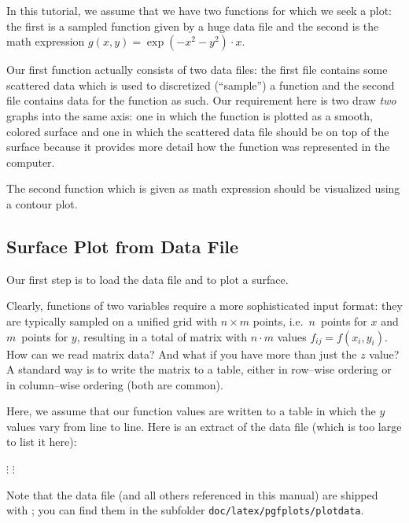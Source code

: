 
In this tutorial, we assume that we have two functions for which we seek a plot: the first is a sampled function given by a huge data file and the second is the math expression $g(x,y)=\exp(-x^2-y^2)\cdot x$. 

Our first function actually consists of two data files: the first file contains some scattered data which is used to discretized (``sample'') a function and the second file contains data for the function as such. 
Our requirement here is two draw \emph{two} graphs into the same axis: one in which the function is plotted as a smooth, colored surface and one in which the scattered data file should be on top of the surface because it provides more detail how the function was represented in the computer. 

The second function which is given as math expression should be visualized using a contour plot. 


\subsection{Surface Plot from Data File}
Our first step is to load the data file and to plot a surface. 

Clearly, functions of two variables require a more sophisticated input format: they are typically sampled on a unified grid with $n \times m$ points, i.e.\ $n$~points for $x$ and $m$~points for $y$, resulting in a total of matrix with $n\cdot m$ values $f_{ij} = f(x_i,y_i)$. How can we read matrix data? And what if you have more than just the $z$ value? A standard way is to write the matrix to a table, either in row--wise ordering or in column--wise ordering (both are common). 

Here, we assume that our function values are written to a table in which the $y$ values vary from line to line. Here is an extract of the data file (which is too large to list it here):

    \baselineskip
    $\vdots$
    \baselineskip
    \baselineskip
    $\vdots$

Note that the data file (and all others referenced in this manual) are shipped with \PGFPlots; you can find them in the subfolder \texttt{doc/latex/pgfplots/plotdata}.

